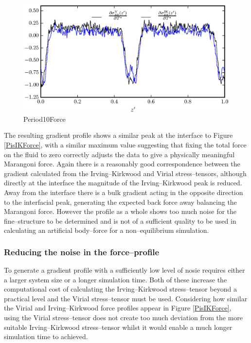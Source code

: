 \begin{figure}[h]
\centering
\includegraphics[scale=0.8]{Period10Force}
\caption{Period10Force}
\label{Period10Force}
\end{figure}
The resulting gradient profile shows a similar peak at the interface to Figure \ref{PisIKForce}, with a similar maximum value suggesting that fixing the total force on the fluid to zero correctly adjusts the data to give a physically meaningful Marangoni force.
Again there is a reasonably good correspondence between the gradient calculated from the Irving--Kirkwood and Virial stress--tensors, although directly at the interface the magnitude of the Irving--Kirkwood peak is reduced.
Away from the interface there is a bulk gradient acting in the opposite direction to the interfacial peak, generating the expected back force away balancing the Marangoni force.
However the profile as a whole shows too much noise for the fine--structure to be determined and is not of a sufficient quality to be used in calculating an artificial body--force for a non--equilibrium simulation.

\subsubsection{Reducing the noise in the force--profile}
To generate a gradient profile with a sufficiently low level of nosie requires either a larger system size or a longer simulation time.
Both of these increase the computational cost of calculating the Irving--Kirkwood stress--tensor beyond a practical level and the Virial stress--tensor must be used.
Considering how similar the Virial and Irving--Kirkwood force profiles appear in Figure \ref{PisIKForce}, using the Virial stress--tensor does not create too much deviation from the more suitable Irving--Kirkwood stress--tensor whilst it would enable a much longer simulation time to achieved.
\FloatBarrier

